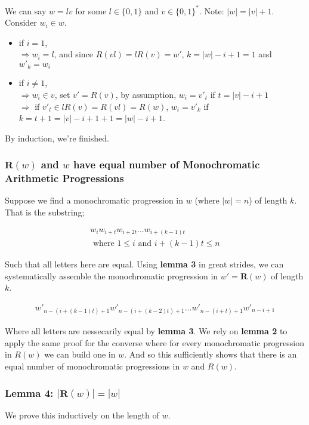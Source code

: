 \documentclass{article}
\begin{document}
We can say $w = lv$ for some $l \in \{0,1\}$ and $v \in \{0,1\}^*$. Note: $|w|=|v|+1$. Consider $w_i \in w$.
\begin{itemize}
	\item if $i=1$, \\
		$\Rightarrow w_i=l$, and since $R(vl) = lR(v) = w'$, $k=|w|-i+1=1$ and $w'_k=w_i$
	\item if $i\not=1$, \\
		$\Rightarrow w_i\in v$, set $v' = R(v)$, by assumption, $w_i=v'_t$ if $t=|v|-i+1$ \\
		$\Rightarrow$ if $v'_t \in lR(v) = R(vl) = R(w)$, $w_i=v'_k$ if \\
		$k=t+1=|v|-i+1+1=|w|-i+1$.
\end{itemize}
By induction, we're finished.

\subsubsection*{$\bm{R}(w)$ and $w$ have equal number of Monochromatic Arithmetic Progressions}
Suppose we find a monochromatic progression in $w$ (where $|w|=n$) of length $k$. That is the substring;

\begin{align*}
	w_iw_{i+t}w_{i+2t}...w_{i+(k-1)t} \\
	\text{ where } 1 \leq i \text{ and } i+(k-1)t \leq n
\end{align*}

Such that all letters here are equal. Using \textbf{lemma 3} in great strides, we can systematically assemble the monochromatic progression in $w' = \bm{R}(w)$ of length $k$.

\begin{align*}
	w'_{n - (i+(k-1)t) + 1}w'_{n - (i+(k-2)t) + 1}...w'_{n - (i+t) + 1}w'_{n - i + 1}
\end{align*}

Where all letters are nessecarily equal by \textbf{lemma 3}. We rely on \textbf{lemma 2} to apply the same proof for the converse where for every monochromatic progression in $R(w)$ we can build one in $w$. And so this sufficiently shows that there is an equal number of monochromatic progressions in $w$ and $R(w)$.

\subsubsection*{Lemma 4: $|\bm{R}(w)|=|w|$}
We prove this inductively on the length of $w$.
\end{document}
